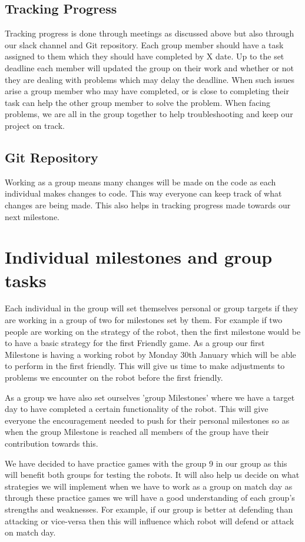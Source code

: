\documentclass{article}
\begin{document}
\subsection{Tracking Progress}
Tracking progress is done through meetings as discussed above but also through
our slack channel and Git repository. Each group member should have a task
assigned to them which they should have completed by X date. Up to the set
deadline each member will updated the group on their work and whether or not
they are dealing with problems which may delay the deadline. When such issues
arise a group member who may have completed, or is close to completing their
task can help the other group member to solve the problem. When facing problems,
we are all in the group together to help troubleshooting and keep our project on
track.

\subsection{Git Repository}
Working as a group means many changes will be made on the code as each
individual makes changes to code. This way everyone can keep track of what
changes are being made. This also helps in tracking progress made towards our
next milestone.


\section{Individual milestones and group tasks}
Each individual in the group will set themselves personal or group targets if
they are working in a group of two for milestones set by them. For example if
two people are working on the strategy of the robot, then the first milestone
would be to have a basic strategy for the first Friendly game. As a group our
first Milestone is having a working robot by Monday 30th January which will be
able to perform in the first friendly. This will give us time to make
adjustments to problems we encounter on the robot before the first friendly.

As a group we have also set ourselves 'group Milestones' where we have a target
day to have completed a certain functionality of the robot. This will give
everyone the encouragement needed to push for their personal milestones so as
when the group Milestone is reached all members of the group have their
contribution towards this.

We have decided to have practice games with the group 9 in our group as this
will benefit both groups for testing the robots. It will also help us decide on
what strategies we will implement when we have to work as a group on match day
as through these practice games we will have a good understanding of each
group's strengths and weaknesses. For example, if our group is better at
defending than attacking or vice-versa then this will influence which robot will
defend or attack on match day.
\end{document}
